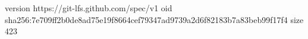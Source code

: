 version https://git-lfs.github.com/spec/v1
oid sha256:7e709ff2b0de8ad75e19f8664cef79347ad9739a2d6f82183b7a83beb99f17f4
size 423

